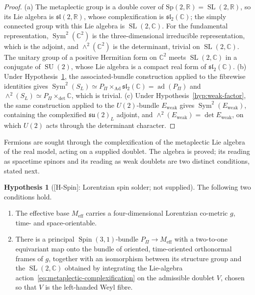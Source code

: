 \documentclass[11pt,a4paper]{article}
\theoremstyle{definition}
\newtheorem{hypothesis}[theorem]{Hypothesis}
\theoremstyle{remark}
\newcommand{\Spin}{\operatorname{Spin}}
\newcommand{\SL}{\operatorname{SL}}
\newcommand{\SU}{\operatorname{SU}}
\begin{document}
    \begin{proof}
      (a) The metaplectic group is a double cover of $\mathrm{Sp}(2,\mathbb{R}) = \SL(2,\mathbb{R})$, so its Lie
      algebra is $\mathfrak{sl}(2,\mathbb{R})$, whose complexification is $\mathfrak{sl}_2(\mathbb{C})$; the
      simply connected group with this Lie algebra is $\SL(2,\mathbb{C})$.
      For the fundamental representation, $\operatorname{Sym}^2(\mathbb{C}^2)$ is the three-dimensional
      irreducible representation, which is the adjoint, and $\wedge^2(\mathbb{C}^2)$ is the determinant,
      trivial on $\SL(2,\mathbb{C})$.
      The unitary group of a positive Hermitian form on $\mathbb{C}^2$ meets $\SL(2,\mathbb{C})$ in a conjugate
      of $\SU(2)$, whose Lie algebra is a compact real form of $\mathfrak{sl}_2(\mathbb{C})$.
      (b) Under Hypothesis~\ref{hyp:spin-solder}, the associated-bundle construction applied to the fibrewise
      identities gives $\operatorname{Sym}^2(S_L) \simeq P_\Pi \times_{\mathrm{Ad}} \mathfrak{sl}_2(\mathbb{C})
      = \operatorname{ad}(P_\Pi)$ and $\wedge^2(S_L) \simeq P_\Pi \times_{\det} \mathbb{C}$, which is trivial.
      (c) Under Hypothesis~\ref{hyp:weak-factor}, the same construction applied to the $U(2)$-bundle
      $E_{\mathrm{weak}}$ gives $\operatorname{Sym}^2(E_{\mathrm{weak}})$, containing the complexified
      $\mathfrak{su}(2)_L$ adjoint, and $\wedge^2(E_{\mathrm{weak}}) = \det E_{\mathrm{weak}}$, on which
      $U(2)$ acts through the determinant character.
    \end{proof}

    Fermions are sought through the complexification of the metaplectic Lie algebra of the real model,
    acting on a supplied doublet.
    The algebra is proved; its reading as spacetime spinors and its reading as weak doublets are two
    distinct conditions, stated next.

    \begin{hypothesis}[{[H-Spin]}: Lorentzian spin solder; not supplied]
      \label{hyp:spin-solder}
      The following two conditions hold.
      \begin{enumerate}
        \item[\emph{(i)}] The effective base $M_{\mathrm{eff}}$ carries a four-dimensional Lorentzian co-metric
        $g$, time- and space-orientable.
        \item[\emph{(ii)}] There is a principal $\Spin(3,1)$-bundle $P_\Pi \to M_{\mathrm{eff}}$ with a
        two-to-one equivariant map onto the bundle of oriented, time-oriented orthonormal frames of $g$,
        together with an isomorphism between its structure group and the $\SL(2,\mathbb{C})$ obtained by
        integrating the Lie-algebra action~\eqref{eq:metaplectic-complexification} on the admissible
        doublet $V$, chosen so that $V$ is the left-handed Weyl fibre.
      \end{enumerate}
    \end{hypothesis}
\end{document}
